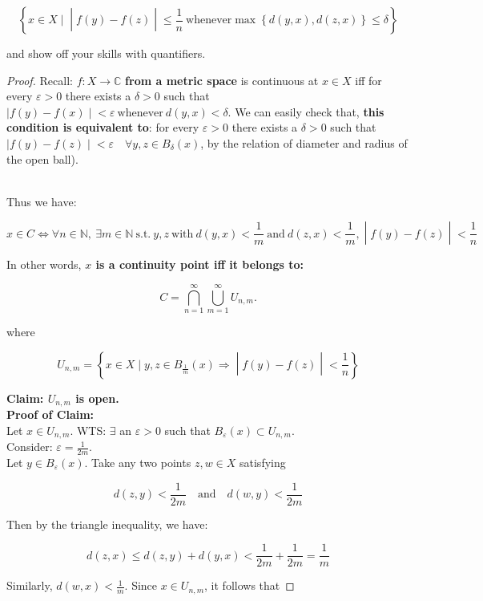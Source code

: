\documentclass{qlnotes-export}
\begin{document}
\[\left\{ x \in X \mid \middle| f(y) - f(z) \middle| \leq \frac{1}{n}\ \text{whenever}\max\left\{ {d(y,x),d(z,x)} \right\} \leq \delta \right\}\]

and show off your skills with quantifiers.

\begin{proof}

Recall: \(f:X\rightarrow{\mathbb{C}}\) \textbf{from a metric space} is continuous at \(x \in X\) iff for every \(\varepsilon > 0\) there exists a \(\delta > 0\) such that\(\left. |f(y) - f(x) \middle| < \varepsilon\ \text{whenever}\ d(y,x) < \delta \right.\). We can easily check that, \textbf{this condition is equivalent to}: for every \(\varepsilon > 0\) there exists a \(\delta > 0\) such that \(\left. |f(y) - f(z) \middle| < \varepsilon\quad\forall y,z \in B_{\delta}(x) \right.\), by the relation of diameter and radius of the open ball).\\
\strut \\
Thus we have:

\[\left. x \in C\Leftrightarrow\forall n \in {\mathbb{N}},\ \exists m \in {\mathbb{N}}\ \text{s.t.}\ y,z\ \text{with}\ d(y,x) < \frac{1}{m}\ \text{and}\ d(z,x) < \frac{1}{m}, \middle| f(y) - f(z) \middle| < \frac{1}{n} \right.\]

In other words, \textbf{\(x\) is a continuity point iff it belongs to:}

\[C = \bigcap\limits_{n = 1}^{\infty}\bigcup\limits_{m = 1}^{\infty}U_{n,m}.\]

where

\[U_{n,m} = \left\{ x \in X \mid y,z \in B_{\frac{1}{m}}(x)\Longrightarrow \middle| f(y) - f(z) \middle| < \frac{1}{n} \right\}\]

\textbf{Claim: \(U_{n,m}\) is open.}\\
\textbf{Proof of Claim:}\\
Let \(x \in U_{n,m}\). WTS: \(\exists\) an \(\varepsilon > 0\) such that \(B_{\varepsilon}(x) \subset U_{n,m}\).\\
Consider: \(\varepsilon = \frac{1}{2m}\).\\
Let \(y \in B_{\varepsilon}(x)\). Take any two points \(z,w \in X\) satisfying

\[d(z,y) < \frac{1}{2m}\quad\text{and}\quad d(w,y) < \frac{1}{2m}\]

Then by the triangle inequality, we have:

\[d(z,x) \leq d(z,y) + d(y,x) < \frac{1}{2m} + \frac{1}{2m} = \frac{1}{m}\]

Similarly, \(d(w,x) < \frac{1}{m}\). Since \(x \in U_{n,m}\), it follows that


\end{proof}
\end{document}
